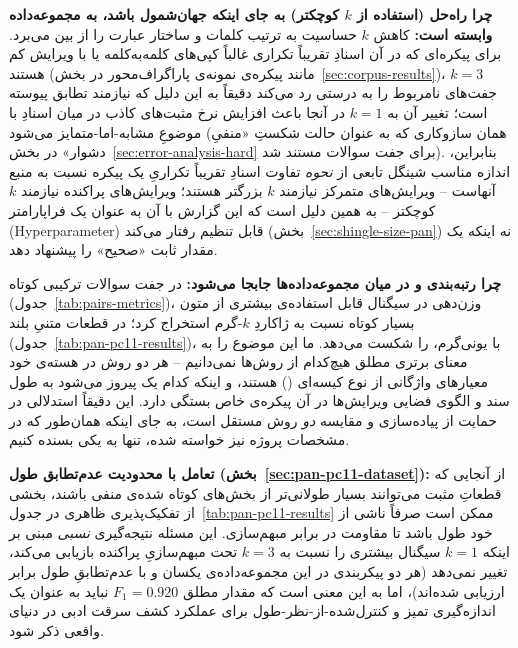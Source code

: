 \documentclass[11pt,a4paper]{article}
\begin{document}
	\textbf{چرا راه‌حل (استفاده از $k$ کوچکتر) به جای اینکه جهان‌شمول باشد، به مجموعه‌داده وابسته است:} کاهش $k$ حساسیت به ترتیب کلمات و ساختار عبارت را از بین می‌برد. برای پیکره‌ای که در آن اسنادِ تقریباً تکراری غالباً کپی‌های کلمه‌به‌کلمه یا با ویرایش کم هستند (مانند پیکره‌ی نمونه‌ی پاراگراف‌محور در بخش~\ref{sec:corpus-results})، $k=3$ جفت‌های نامربوط را به درستی رد می‌کند دقیقاً به این دلیل که نیازمند تطابق پیوسته است؛ تغییر آن به $k=1$ در آنجا باعث افزایش نرخ مثبت‌های کاذب در میان اسنادِ با موضوعِ مشابه-اما-متمایز می‌شود (همان سازوکاری که به عنوان حالت شکستِ «منفیِ دشوار» در بخش~\ref{sec:error-analysis-hard} برای جفت سوالات مستند شد). بنابراین، اندازه مناسب شینگل تابعی از \emph{نحوه} تفاوت اسنادِ تقریباً تکراریِ یک پیکره نسبت به منبع آنهاست -- ویرایش‌های متمرکز نیازمند $k$ بزرگتر هستند؛ ویرایش‌های پراکنده نیازمند $k$ کوچکتر -- به همین دلیل است که این گزارش با آن به عنوان یک فراپارامتر (Hyperparameter) قابل تنظیم رفتار می‌کند (بخش~\ref{sec:shingle-size-pan}) نه اینکه یک مقدار ثابت «صحیح» را پیشنهاد دهد.
	
	\textbf{چرا رتبه‌بندی  و  در میان مجموعه‌داده‌ها جابجا می‌شود:} در جفت سوالات ترکیبی کوتاه (جدول~\ref{tab:pairs-metrics})، وزن‌دهی  در  سیگنال قابل استفاده‌ی بیشتری از متون بسیار کوتاه نسبت به ژاکاردِ $k$-گرم استخراج کرد؛ در قطعات متنیِ بلند  (جدول~\ref{tab:pan-pc11-results})،  با یونی‌گرم،  را شکست می‌دهد. ما این موضوع را به معنای برتری مطلق هیچ‌کدام از روش‌ها نمی‌دانیم -- هر دو روش در هسته‌ی خود معیارهای واژگانی از نوع کیسه‌ای () هستند، و اینکه کدام یک پیروز می‌شود به طول سند و الگوی فضایی ویرایش‌ها در آن پیکره‌ی خاص بستگی دارد. این دقیقاً استدلالی در حمایت از پیاده‌سازی و مقایسه \emph{دو} روش مستقل است، به جای اینکه همان‌طور که در مشخصات پروژه نیز خواسته شده، تنها به یکی بسنده کنیم.
	
	\textbf{تعامل با محدودیت عدم‌تطابق طول (بخش~\ref{sec:pan-pc11-dataset}):} از آنجایی که قطعاتِ مثبت می‌توانند بسیار طولانی‌تر از بخش‌های کوتاه شده‌ی منفی باشند، بخشی از تفکیک‌پذیری ظاهری در جدول~\ref{tab:pan-pc11-results} ممکن است صرفاً ناشی از خود طول باشد تا مقاومت در برابر مبهم‌سازی. این مسئله نتیجه‌گیری \emph{نسبی} مبنی بر اینکه $k=1$ سیگنال بیشتری را نسبت به $k=3$ تحت مبهم‌سازیِ پراکنده بازیابی می‌کند، تغییر نمی‌دهد (هر دو پیکربندی در این مجموعه‌داده‌ی یکسان و با عدم‌تطابقِ طول برابر ارزیابی شده‌اند)، اما به این معنی است که مقدار مطلق $F_1=0.920$ نباید به عنوان یک اندازه‌گیری تمیز و کنترل‌شده-از-نظر-طول برای عملکرد کشف سرقت ادبی در دنیای واقعی ذکر شود.
\end{document}
